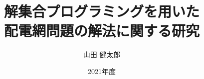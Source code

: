 \documentclass[japanese,dvipdfmx]{jbook}
\institute{名古屋大学大学院情報学研究科}
\title{解集合プログラミングを用いた\\配電網問題の解法に関する研究}
\date{2021年度}
\author{山田 健太郎}
\begin{document}
\maketitle



\tableofcontents    %
\listoffigures      %
\listoftables       %
\lstlistoflistings  %













%
\end{document}
